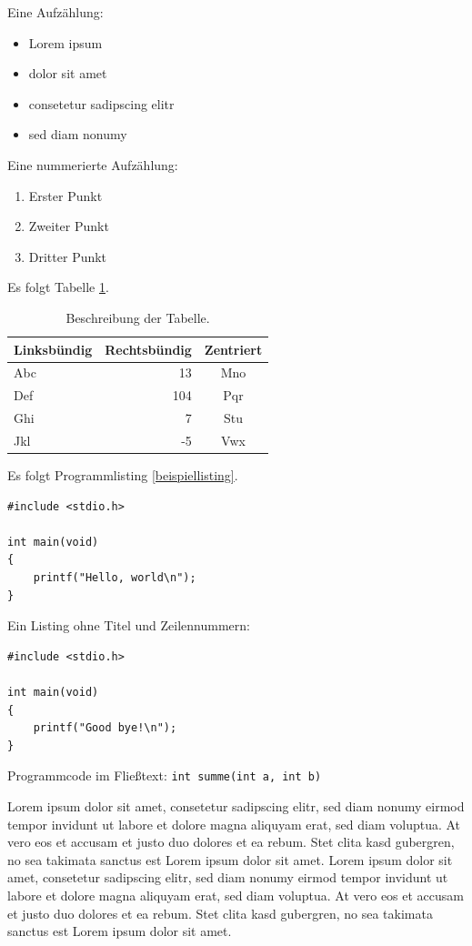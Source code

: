 Eine Aufzählung:

\begin{itemize}
\item Lorem ipsum
\item dolor sit amet
\item consetetur sadipscing elitr
\item sed diam nonumy
\end{itemize}

Eine nummerierte Aufzählung:

\begin{enumerate}
\item Erster Punkt
\item Zweiter Punkt
\item Dritter Punkt
\end{enumerate}

Es folgt Tabelle \ref{beispieltabelle}.

\begin{table}[hb!]
\centering
\begin{tabular}{lrc}
\toprule
Linksbündig & Rechtsbündig & Zentriert \\
\midrule
Abc &  13 & Mno \\ \addlinespace
Def & 104 & Pqr \\ \addlinespace
Ghi &   7 & Stu \\ \addlinespace
Jkl &  -5 & Vwx \\
\bottomrule
\end{tabular}
\caption{Beschreibung der Tabelle.}
\label{beispieltabelle}
\end{table}

Es folgt Programmlisting \ref{beispiellisting}.

\begin{lstlisting}[caption={Beschreibung des Listings.}, label=beispiellisting]
#include <stdio.h>

int main(void)
{
    printf("Hello, world\n");
}
\end{lstlisting}

Ein Listing ohne Titel und Zeilennummern:

\begin{lstlisting}[numbers=none]
#include <stdio.h>

int main(void)
{
    printf("Good bye!\n");
}
\end{lstlisting}

Programmcode im Fließtext: \lstinline{int summe(int a, int b)}

Lorem ipsum dolor sit amet, consetetur sadipscing elitr, sed diam nonumy eirmod tempor invidunt ut labore et dolore magna aliquyam erat, sed diam voluptua. At vero eos et accusam et justo duo dolores et ea rebum. Stet clita kasd gubergren, no sea takimata sanctus est Lorem ipsum dolor sit amet. Lorem ipsum dolor sit amet, consetetur sadipscing elitr, sed diam nonumy eirmod tempor invidunt ut labore et dolore magna aliquyam erat, sed diam voluptua. At vero eos et accusam et justo duo dolores et ea rebum. Stet clita kasd gubergren, no sea takimata sanctus est Lorem ipsum dolor sit amet.
